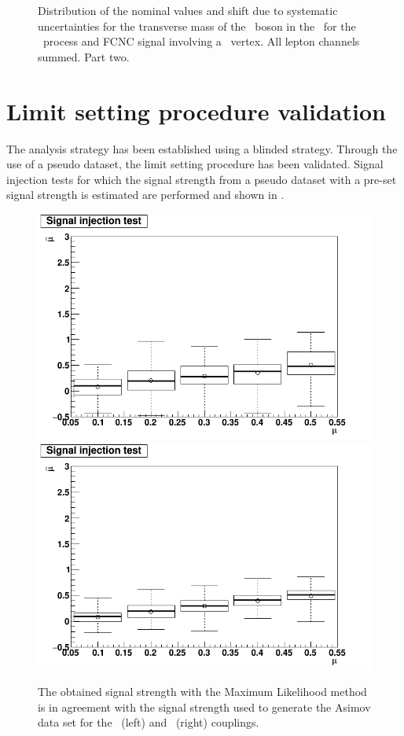 \begin{figure}[htbp]
{	}
	\caption{Distribution of the nominal values and shift due to systematic uncertainties for the transverse mass of the \PW\ boson in the \STSR\ for the \WZ\ process and FCNC signal involving a \Zut\ vertex. All lepton channels summed. Part two.}
	\label{fig:shiftBDTSTZut}
\end{figure}
\clearpage
\section{Limit setting procedure validation}
The analysis strategy has been established using a blinded strategy. Through the use of a pseudo dataset, the limit setting procedure has been validated. Signal injection tests for which the signal strength from a pseudo dataset with a pre-set  signal strength is estimated are performed and shown in . 
\begin{figure}[htbp]
	\centering
	 \includegraphics[width=0.49\linewidth]{6_Search/Figures/SignalInjection/plotZut}
	 \includegraphics[width=0.49\linewidth]{6_Search/Figures/SignalInjection/plotZct}
	\caption{The  obtained signal strength with the Maximum Likelihood method is in agreement with the signal strength used to generate the Asimov data set for the \Zut\ (left) and \Zct\ (right) couplings.}
	\label{fig:plotzut}
\end{figure}

